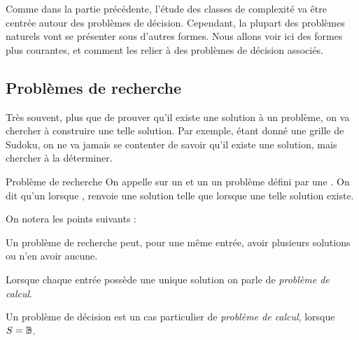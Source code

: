 \documentclass[a4paper,french,bookmarks]{book}
\begin{document}
    Comme dans la partie précédente, l'étude des classes de complexité va être centrée autour des problèmes de décision. Cependant, la plupart des problèmes naturels vont se présenter sous d'autres formes. Nous allons voir ici des formes plus courantes, et comment les relier à des problèmes de décision associés.
    
    \subsection{Problèmes de recherche}
    
    Très souvent, plus que de prouver qu'il existe une solution à un problème, on va chercher à construire une telle solution. Par exemple, étant donné une grille de Sudoku, on ne va jamais se contenter de savoir qu'il existe une solution, mais chercher à la déterminer.
    
    
    \begin{definition}{Problème de recherche}{}
        On appelle  sur un  et un  un problème défini par une . On dit qu'un  lorsque ,  renvoie une solution  telle que  lorsque une telle solution existe.
    \end{definition}
    
    On notera les points suivants :
    
    \begin{enumerate}
        \itt Un problème de recherche peut, pour une même entrée, avoir plusieurs solutions ou n'en avoir aucune.  
    
        \itt Lorsque chaque entrée possède une unique solution on parle de \emph{problème de calcul}. 
        
        \itt Un problème de décision est un cas particulier de \emph{problème de calcul}, lorsque $S = \mathbb{B}$.
    \end{enumerate}
    
\end{document}
